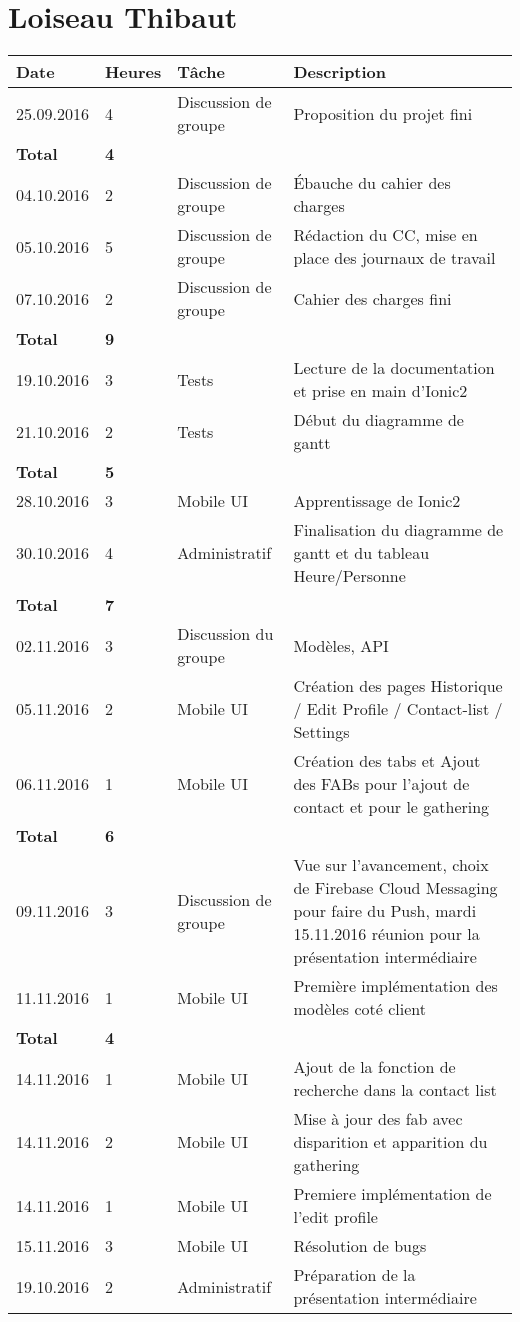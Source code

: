 \documentclass[french]{article}
\begin{document}
	\section*{Loiseau Thibaut}
	\begin{longtable}{p{}|p{}|p{}|p{}}
		Date&Heures&Tâche&Description\\
		\hline \hline
		25.09.2016 & 4 & Discussion de groupe & Proposition du projet fini\\
		\textbf{Total} & \textbf{4} &&\\
		\hline
		04.10.2016 & 2 & Discussion de groupe & Ébauche du cahier des charges\\
		05.10.2016 & 5 & Discussion de groupe & Rédaction du CC, mise en place des journaux de travail\\
		07.10.2016 & 2 & Discussion de groupe & Cahier des charges fini\\
		\textbf{Total} & \textbf{9} &&\\
		\hline
		19.10.2016 & 3 & Tests & Lecture de la documentation et prise en main d'Ionic2\\
		21.10.2016 & 2 & Tests & Début du diagramme de gantt\\
		\textbf{Total} & \textbf{5} &&\\
		\hline
		28.10.2016 & 3 & Mobile UI & Apprentissage de Ionic2 \\
		30.10.2016 & 4 & Administratif & Finalisation du diagramme de gantt et du tableau Heure/Personne  \\
		\textbf{Total} & \textbf{7} &&\\
		\hline
		02.11.2016 & 3 & Discussion du groupe & Modèles, API\\
		05.11.2016 & 2 & Mobile UI & Création des pages Historique / Edit Profile / Contact-list / Settings\\
		06.11.2016 & 1 & Mobile UI & Création des tabs et Ajout des FABs pour l'ajout de contact et pour le gathering\\
		\textbf{Total} & \textbf{6} &&\\
		\hline
		09.11.2016 & 3 & Discussion de groupe & Vue sur l'avancement, choix de Firebase Cloud Messaging pour faire du Push, mardi 15.11.2016 réunion pour la présentation intermédiaire\\
		11.11.2016 & 1 & Mobile UI & Première implémentation des modèles coté client\\
		\textbf{Total} & \textbf{4} &&\\
		\hline
		14.11.2016 & 1 & Mobile UI & Ajout de la fonction de recherche dans la contact list\\
		14.11.2016 & 2 & Mobile UI & Mise à jour des fab avec disparition et apparition du gathering\\
		14.11.2016 & 1 & Mobile UI & Premiere implémentation de l'edit profile\\
		15.11.2016 & 3 & Mobile UI & Résolution de bugs\\
		19.10.2016 & 2 & Administratif & Préparation de la présentation intermédiaire  \\
		

\end{longtable}
\end{document}
